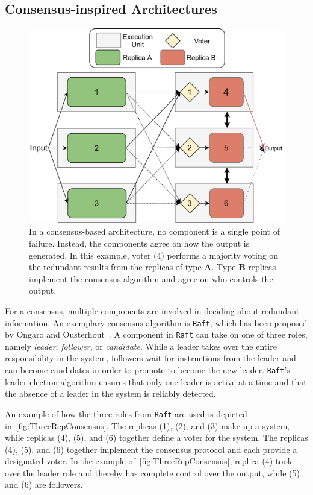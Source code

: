 \subsection{Consensus-inspired Architectures}
\label{subsec:consensusArchitecture}
\begin{figure}[!hb]
	\centering
	\includegraphics[width=0.8\linewidth]{images/ThreeComponentConsensus}
	\caption{In a consensus-based architecture, no component is a single point of failure. Instead, the components agree on how the output is generated. In this example, voter (4) performs a majority voting on the redundant results from the replicas of type \textbf{A}. Type \textbf{B} replicas implement the consensus algorithm and agree on who controls the output.}
	\label{fig:ThreeRepConsensus}
\end{figure}

For a consensus, multiple components are involved in deciding about redundant information.
An exemplary consensus algorithm is \texttt{Raft}, which has been proposed by Ongaro and Ousterhout~\cite{RaftConsensusPaper}.
A component in \texttt{Raft} can take on one of three roles, namely \textit{leader}, \textit{follower}, or \textit{candidate}.
While a leader takes over the entire responsibility in the system, followers wait for instructions from the leader and can become candidates in order to promote to become the new leader.
\texttt{Raft}'s leader election algorithm ensures that only one leader is active at a time and that the absence of a leader in the system is reliably detected.

An example of how the three roles from \texttt{Raft} are used is depicted in~\autoref{fig:ThreeRepConsensus}.
The replicas (1), (2), and (3) make up a  system, while replicas (4), (5), and (6) together define a voter for the system.
The replicas (4), (5), and (6) together implement the consensus protocol and each provide a designated voter.
In the example of~\autoref{fig:ThreeRepConsensus}, replica (4) took over the leader role and thereby has complete control over the output, while (5) and (6) are followers.
\\

